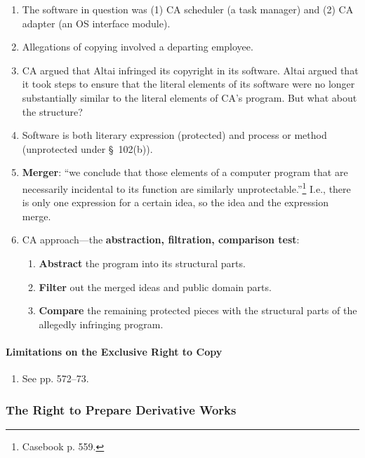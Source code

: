 \begin{enumerate}
    \item The software in question was (1) CA scheduler (a task manager) and 
    (2) CA adapter (an OS interface module).
    \item Allegations of copying involved a departing employee.
    \item CA argued that Altai infringed its copyright in its software. Altai 
    argued that it took steps to ensure that the literal elements of its 
    software were no longer substantially similar to the literal elements of 
    CA's program. But what about the structure?
    \item Software is both literary expression (protected) and process or 
    method (unprotected under \S\ 102(b)).
    \item \textbf{Merger}: ``we conclude that those elements of a computer 
    program that are necessarily incidental to its function are similarly 
    unprotectable.''\footnote{Casebook p. 559.} I.e., there is only one 
    expression for a certain idea, so the idea and the expression merge.
    \item CA approach---the \textbf{abstraction, filtration, comparison test}:
    \begin{enumerate}
        \item \textbf{Abstract} the program into its structural parts.
        \item \textbf{Filter} out the merged ideas and public domain parts.
        \item \textbf{Compare} the remaining protected pieces with the 
        structural parts of the allegedly infringing program.
    \end{enumerate}
\end{enumerate}

\paragraph{Limitations on the Exclusive Right to Copy}

\begin{enumerate}
    \item See pp. 572--73.
\end{enumerate}

\subsubsection{The Right to Prepare Derivative Works}

